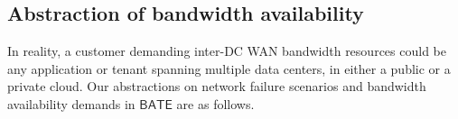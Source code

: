 \documentclass[sigconf]{acmart}
\begin{document}
\subsection{Abstraction of bandwidth availability}
In reality, a customer demanding inter-DC WAN bandwidth resources could be any application or tenant  spanning multiple data centers, in either a public or a private cloud. 
Our abstractions on network failure scenarios and bandwidth availability demands in $\mathsf{BATE}$ are as follows.
\end{document}
